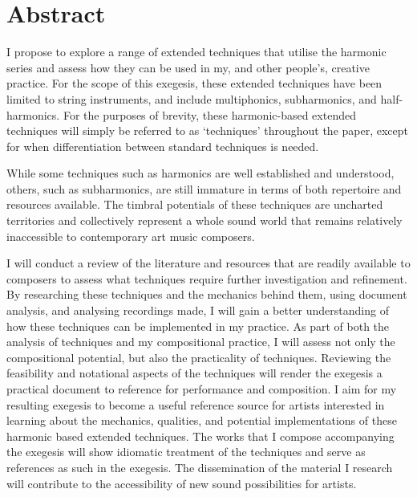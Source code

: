 \chapter*{Abstract}
 

I propose to explore a range of extended techniques that utilise the harmonic series and assess how they can be used in my, and other people's, creative practice. 
For the scope of this exegesis, these extended techniques have been limited to string instruments, and include multiphonics, subharmonics, and half-harmonics. 
For the purposes of brevity, these harmonic-based extended techniques will simply be referred to as `techniques' throughout the paper, except for when differentiation between standard techniques is needed.

While some techniques such as harmonics are well established and understood, others, such as subharmonics, are still immature in terms of both repertoire and resources available. The timbral potentials of these techniques are uncharted territories and collectively represent a whole sound world that remains relatively inaccessible to contemporary art music composers.

I will conduct a review of the literature and resources that are readily available to composers to assess what techniques require further investigation and refinement. 
By researching these techniques and the mechanics behind them, using document analysis, and analysing recordings made, I will gain a better understanding of how these techniques can be implemented in my practice. 
As part of both the analysis of techniques and my compositional practice, I will assess not only the compositional potential, but also the practicality of techniques. 
Reviewing the feasibility and notational aspects of the techniques will render the exegesis a practical document to reference for performance and composition. 
I aim for my resulting exegesis to become a useful reference source for artists interested in learning about the mechanics, qualities, and potential implementations of these harmonic based extended techniques. 
The works that I compose accompanying the exegesis will show idiomatic treatment of the techniques and serve as references as such in the exegesis. 
The dissemination of the material I research will contribute to the accessibility of new sound possibilities for artists. 